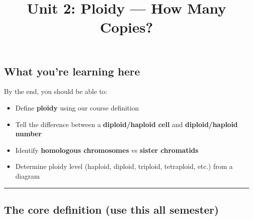 \documentclass[
  letterpaper,
  DIV=11,
  numbers=noendperiod]{scrartcl}
\title{Unit 2: Ploidy --- How Many Copies?}
\author{}
\date{}
\providecommand{\tightlist}{%
  \setlength{\itemsep}{0pt}\setlength{\parskip}{0pt}}
\renewcommand*\contentsname{Table of contents}
\newcommand\contentsname{Table of contents}
\begin{document}
\maketitle

\renewcommand*\contentsname{Table of contents}
{
\hypersetup{linkcolor=}
\setcounter{tocdepth}{3}
\tableofcontents
}

\subsection{What you're learning here}\label{what-youre-learning-here}

By the end, you should be able to:

\begin{itemize}
\tightlist
\item
  Define \textbf{ploidy} using our course definition
\item
  Tell the difference between a \textbf{diploid/haploid cell} and
  \textbf{diploid/haploid number}
\item
  Identify \textbf{homologous chromosomes} vs \textbf{sister chromatids}
\item
  Determine ploidy level (haploid, diploid, triploid, tetraploid, etc.)
  from a diagram
\end{itemize}

\begin{center}\rule{0.5\linewidth}{0.5pt}\end{center}

\subsection{The core definition (use this all
semester)}\label{the-core-definition-use-this-all-semester}
\end{document}
